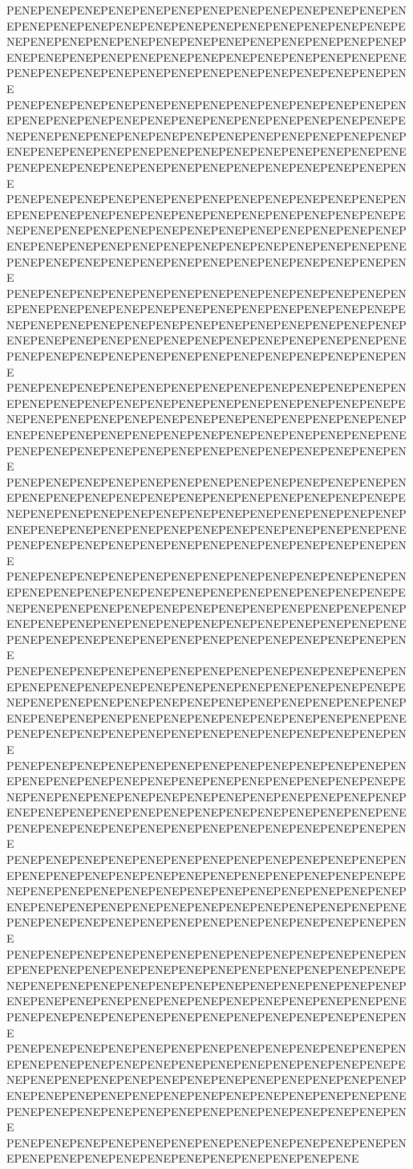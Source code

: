 PENEPENEPENEPENEPENEPENEPENEPENEPENEPENEPENEPENEPENEPENEPENEPENEPENEPENEPENEPENEPENEPENEPENEPENEPENEPENEPENEPENEPENEPENEPENEPENEPENEPENEPENEPENEPENEPENEPENEPENEPENEPENEPENEPENEPENEPENEPENEPENEPENEPENEPENEPENEPENEPENEPENEPENEPENEPENEPENEPENEPENEPENEPENEPENE
PENEPENEPENEPENEPENEPENEPENEPENEPENEPENEPENEPENEPENEPENEPENEPENEPENEPENEPENEPENEPENEPENEPENEPENEPENEPENEPENEPENEPENEPENEPENEPENEPENEPENEPENEPENEPENEPENEPENEPENEPENEPENEPENEPENEPENEPENEPENEPENEPENEPENEPENEPENEPENEPENEPENEPENEPENEPENEPENEPENEPENEPENEPENEPENE
PENEPENEPENEPENEPENEPENEPENEPENEPENEPENEPENEPENEPENEPENEPENEPENEPENEPENEPENEPENEPENEPENEPENEPENEPENEPENEPENEPENEPENEPENEPENEPENEPENEPENEPENEPENEPENEPENEPENEPENEPENEPENEPENEPENEPENEPENEPENEPENEPENEPENEPENEPENEPENEPENEPENEPENEPENEPENEPENEPENEPENEPENEPENEPENE
PENEPENEPENEPENEPENEPENEPENEPENEPENEPENEPENEPENEPENEPENEPENEPENEPENEPENEPENEPENEPENEPENEPENEPENEPENEPENEPENEPENEPENEPENEPENEPENEPENEPENEPENEPENEPENEPENEPENEPENEPENEPENEPENEPENEPENEPENEPENEPENEPENEPENEPENEPENEPENEPENEPENEPENEPENEPENEPENEPENEPENEPENEPENEPENE
PENEPENEPENEPENEPENEPENEPENEPENEPENEPENEPENEPENEPENEPENEPENEPENEPENEPENEPENEPENEPENEPENEPENEPENEPENEPENEPENEPENEPENEPENEPENEPENEPENEPENEPENEPENEPENEPENEPENEPENEPENEPENEPENEPENEPENEPENEPENEPENEPENEPENEPENEPENEPENEPENEPENEPENEPENEPENEPENEPENEPENEPENEPENEPENE
PENEPENEPENEPENEPENEPENEPENEPENEPENEPENEPENEPENEPENEPENEPENEPENEPENEPENEPENEPENEPENEPENEPENEPENEPENEPENEPENEPENEPENEPENEPENEPENEPENEPENEPENEPENEPENEPENEPENEPENEPENEPENEPENEPENEPENEPENEPENEPENEPENEPENEPENEPENEPENEPENEPENEPENEPENEPENEPENEPENEPENEPENEPENEPENE
PENEPENEPENEPENEPENEPENEPENEPENEPENEPENEPENEPENEPENEPENEPENEPENEPENEPENEPENEPENEPENEPENEPENEPENEPENEPENEPENEPENEPENEPENEPENEPENEPENEPENEPENEPENEPENEPENEPENEPENEPENEPENEPENEPENEPENEPENEPENEPENEPENEPENEPENEPENEPENEPENEPENEPENEPENEPENEPENEPENEPENEPENEPENEPENE
PENEPENEPENEPENEPENEPENEPENEPENEPENEPENEPENEPENEPENEPENEPENEPENEPENEPENEPENEPENEPENEPENEPENEPENEPENEPENEPENEPENEPENEPENEPENEPENEPENEPENEPENEPENEPENEPENEPENEPENEPENEPENEPENEPENEPENEPENEPENEPENEPENEPENEPENEPENEPENEPENEPENEPENEPENEPENEPENEPENEPENEPENEPENEPENE
PENEPENEPENEPENEPENEPENEPENEPENEPENEPENEPENEPENEPENEPENEPENEPENEPENEPENEPENEPENEPENEPENEPENEPENEPENEPENEPENEPENEPENEPENEPENEPENEPENEPENEPENEPENEPENEPENEPENEPENEPENEPENEPENEPENEPENEPENEPENEPENEPENEPENEPENEPENEPENEPENEPENEPENEPENEPENEPENEPENEPENEPENEPENEPENE
PENEPENEPENEPENEPENEPENEPENEPENEPENEPENEPENEPENEPENEPENEPENEPENEPENEPENEPENEPENEPENEPENEPENEPENEPENEPENEPENEPENEPENEPENEPENEPENEPENEPENEPENEPENEPENEPENEPENEPENEPENEPENEPENEPENEPENEPENEPENEPENEPENEPENEPENEPENEPENEPENEPENEPENEPENEPENEPENEPENEPENEPENEPENEPENE
PENEPENEPENEPENEPENEPENEPENEPENEPENEPENEPENEPENEPENEPENEPENEPENEPENEPENEPENEPENEPENEPENEPENEPENEPENEPENEPENEPENEPENEPENEPENEPENEPENEPENEPENEPENEPENEPENEPENEPENEPENEPENEPENEPENEPENEPENEPENEPENEPENEPENEPENEPENEPENEPENEPENEPENEPENEPENEPENEPENEPENEPENEPENEPENE
PENEPENEPENEPENEPENEPENEPENEPENEPENEPENEPENEPENEPENEPENEPENEPENEPENEPENEPENEPENEPENEPENEPENEPENEPENEPENEPENEPENEPENEPENEPENEPENEPENEPENEPENEPENEPENEPENEPENEPENEPENEPENEPENEPENEPENEPENEPENEPENEPENEPENEPENEPENEPENEPENEPENEPENEPENEPENEPENEPENEPENEPENEPENEPENE
PENEPENEPENEPENEPENEPENEPENEPENEPENEPENEPENEPENEPENEPENEPENEPENEPENEPENEPENEPENEPENEPENEPENEPENE

